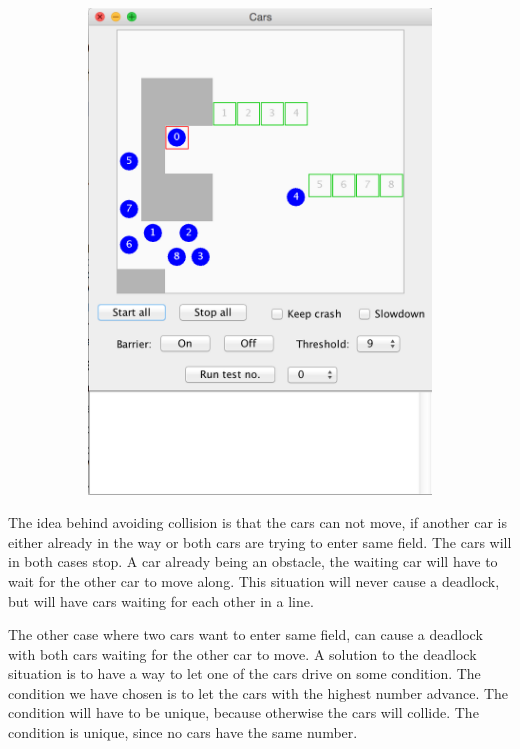 \begin{figure}[H]
\begin{subfigure}[b]{0.4\textwidth}
\includegraphics[scale=0.3]{./graphics/Cars2.png}
\end{subfigure}
\end{figure}

The idea behind avoiding collision is that the cars can not move, if another car is either already in the way or both cars are trying to enter same field. The cars will in both cases stop. A car already being an obstacle, the waiting car will have to wait for the other car to move along. This situation will never cause a deadlock, but will have cars waiting for each other in a line.

The other case where two cars want to enter same field, can cause a deadlock with both cars waiting for the other car to move. A solution to the deadlock situation is to have a way to let one of the cars drive on some condition. The condition we have chosen is to let the cars with the highest number advance. The condition will have to be unique, because otherwise the cars will collide. The condition is unique, since no cars have the same number.
\\

